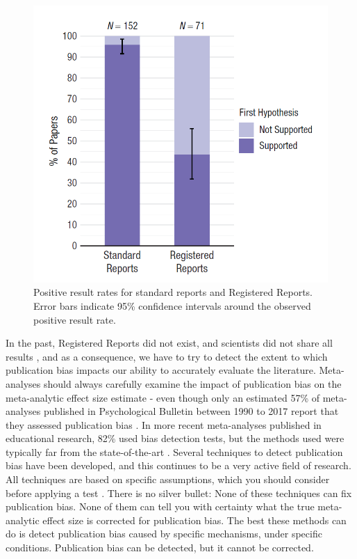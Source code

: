 \documentclass[
  oneside]{krantz}
\begin{document}
\begin{figure}

{\centering \includegraphics[width=0.75\linewidth]{images/scheel} 

}

\caption{Positive result rates for standard reports and Registered Reports. Error bars indicate 95\% confidence intervals around the observed positive result rate.}\label{fig:scheel}
\end{figure}

In the past, Registered Reports did not exist, and scientists did not share all results \citep{franco_publication_2014, greenwald_consequences_1975, sterling_publication_1959}, and as a consequence, we have to try to detect the extent to which publication bias impacts our ability to accurately evaluate the literature. Meta-analyses should always carefully examine the impact of publication bias on the meta-analytic effect size estimate - even though only an estimated 57\% of meta-analyses published in Psychological Bulletin between 1990 to 2017 report that they assessed publication bias \citep{polanin_transparency_2020}. In more recent meta-analyses published in educational research, 82\% used bias detection tests, but the methods used were typically far from the state-of-the-art \citep{ropovik_neglect_2021}. Several techniques to detect publication bias have been developed, and this continues to be a very active field of research. All techniques are based on specific assumptions, which you should consider before applying a test \citep{carter_correcting_2019}. There is no silver bullet: None of these techniques can fix publication bias. None of them can tell you with certainty what the true meta-analytic effect size is corrected for publication bias. The best these methods can do is detect publication bias caused by specific mechanisms, under specific conditions. Publication bias can be detected, but it cannot be corrected.
\end{document}
